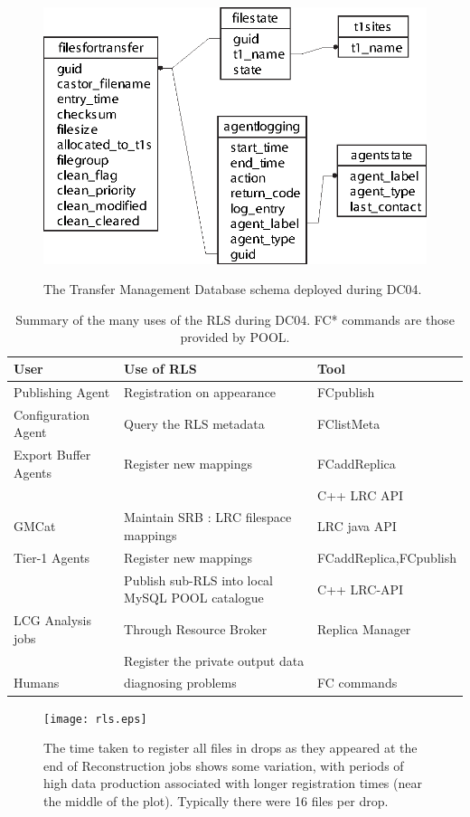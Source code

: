 \documentclass{cmspaper}
\begin{document}
\clearpage
\begin{figure}[tbp]
\centering
\includegraphics{v1_tmdb.eps}
\label{fig:schema}
\caption{The Transfer Management Database schema deployed during DC04.}
\end{figure}
\clearpage
\begin{table}
\begin{tabular}[tbp]{|l|l|l|}
\hline User & Use of RLS & Tool
\\ \hline Publishing Agent & Registration on appearance & FCpublish
\\ Configuration Agent & Query the RLS metadata & FClistMeta
\\ Export Buffer Agents & Register new mappings & FCaddReplica
\\ & & C++ LRC API
\\ GMCat & Maintain SRB : LRC filespace mappings & LRC java API
\\ Tier-1 Agents & Register new mappings & FCaddReplica,FCpublish
\\ & Publish sub-RLS into local MySQL POOL catalogue & C++ LRC-API
\\ LCG Analysis jobs & Through Resource Broker & Replica Manager
\\ & Register the private output data &
\\ Humans & diagnosing problems & FC commands
\\ \hline
\end{tabular}
\label{table:rls}
\caption{Summary of the many uses of the RLS during DC04. FC* commands are those provided by POOL.}
\end{table}
\clearpage
\begin{figure}[tbp]
\centering
\texttt{[image: rls.eps]}
\label{fig:rls}
\caption{The time taken to register all files in drops as they appeared at the end of Reconstruction jobs shows some variation, with periods of high data production associated with longer registration times (near the middle of the plot). Typically there were 16 files per drop.}
\end{figure}
\end{document}
